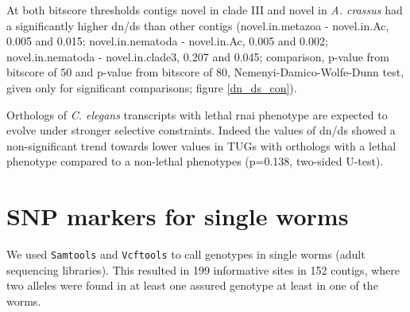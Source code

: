 At both bitscore thresholds contigs novel in clade III and novel in
\textit{A. crassus} had a significantly higher dn/ds than other
contigs (novel.in.metazoa - novel.in.Ac, 0.005 and 0.015;
novel.in.nematoda - novel.in.Ac, 0.005 and 0.002; novel.in.nematoda -
novel.in.clade3, 0.207 and 0.045; comparison, p-value from bitscore of
50 and p-value from bitscore of 80, Nemenyi-Damico-Wolfe-Dunn test,
given only for significant comparisons; figure \ref{dn_ds_con}).


Orthologs of \textit{C. elegans} transcripts with lethal rnai
phenotype are expected to evolve under stronger selective
constraints. Indeed the values of dn/ds showed a non-significant trend
towards lower values in TUGs with orthologs with a lethal phenotype
compared to a non-lethal phenotypes (p=0.138, two-sided U-test).

\section{SNP markers for single worms}

We used \texttt{Samtools}\cite{journals/bioinformatics/LiHWFRHMAD09}
and \texttt{Vcftools}\cite{pmid21653522} to call genotypes in single
worms (adult sequencing libraries). This resulted in 199 informative
sites in 152 contigs, where two alleles were found in at least one
assured genotype at least in one of the worms.


